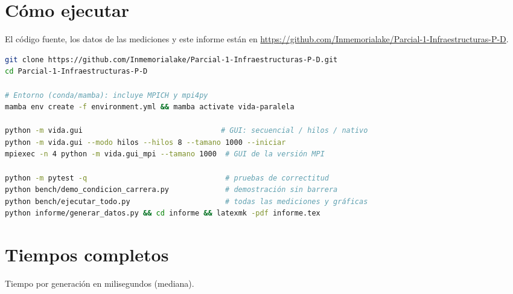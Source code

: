\documentclass[11pt,a4paper]{article}
\begin{document}
\section{Cómo ejecutar}\label{sec:ejecutar}

El código fuente, los datos de las mediciones y este informe están en
\url{https://github.com/Inmemorialake/Parcial-1-Infraestructuras-P-D}.

\begin{lstlisting}[language=bash]
git clone https://github.com/Inmemorialake/Parcial-1-Infraestructuras-P-D.git
cd Parcial-1-Infraestructuras-P-D

# Entorno (conda/mamba): incluye MPICH y mpi4py
mamba env create -f environment.yml && mamba activate vida-paralela

python -m vida.gui                                # GUI: secuencial / hilos / nativo
python -m vida.gui --modo hilos --hilos 8 --tamano 1000 --iniciar
mpiexec -n 4 python -m vida.gui_mpi --tamano 1000  # GUI de la versión MPI

python -m pytest -q                                # pruebas de correctitud
python bench/demo_condicion_carrera.py             # demostración sin barrera
python bench/ejecutar_todo.py                      # todas las mediciones y gráficas
python informe/generar_datos.py && cd informe && latexmk -pdf informe.tex
\end{lstlisting}

\section{Tiempos completos}

\begin{table}[H]
\centering\footnotesize
\caption{Tiempo por generación en milisegundos (mediana).}

\end{table}
\end{document}

